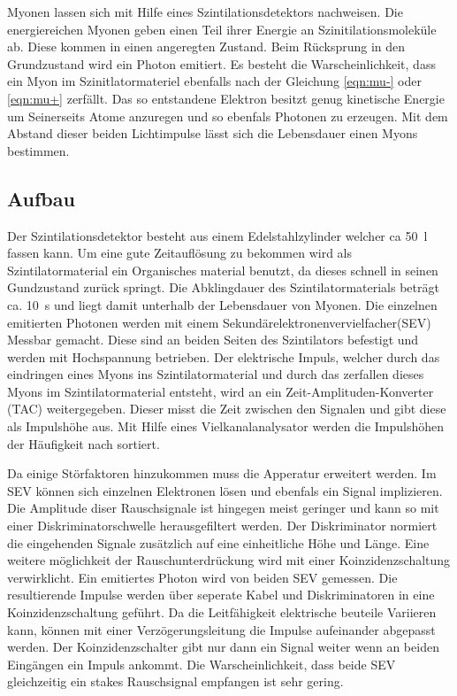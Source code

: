 Myonen lassen sich mit Hilfe eines Szintilationsdetektors nachweisen.
Die energiereichen Myonen geben einen Teil ihrer Energie an Szinitilationsmoleküle ab.
Diese kommen in einen angeregten Zustand.
Beim Rücksprung in den Grundzustand wird ein Photon emitiert.
Es besteht die Warscheinlichkeit, dass ein Myon im Szinitlatormateriel ebenfalls nach der Gleichung \ref{eqn:mu-}
oder \ref{eqn:mu+} zerfällt.
Das so entstandene Elektron besitzt genug kinetische Energie um Seinerseits Atome anzuregen und so ebenfals Photonen zu erzeugen.
Mit dem Abstand dieser beiden Lichtimpulse lässt sich die Lebensdauer einen Myons bestimmen.

\subsection{Aufbau}
Der Szintilationsdetektor besteht aus einem Edelstahlzylinder welcher ca \SI{50}{l} fassen kann.
Um eine gute Zeitauflösung zu bekommen wird als Szintilatormaterial ein Organisches material benutzt,
da dieses schnell in seinen Gundzustand zurück springt.
Die Abklingdauer des Szintilatormaterials beträgt ca. \SI{10}{s} und liegt damit unterhalb der Lebensdauer von Myonen.
Die einzelnen emitierten Photonen werden mit einem Sekundärelektronenvervielfacher(SEV) Messbar gemacht.
Diese sind an beiden Seiten des Szintilators befestigt und werden mit Hochspannung betrieben.
Der elektrische Impuls, welcher durch das eindringen eines Myons ins Szintilatormaterial
und durch das zerfallen dieses Myons im Szintilatormaterial entsteht,
wird an ein Zeit-Amplituden-Konverter (TAC) weitergegeben.
Dieser misst die Zeit zwischen den Signalen und gibt diese als Impulshöhe aus.
Mit Hilfe eines Vielkanalanalysator werden die Impulshöhen der Häufigkeit nach sortiert.

Da einige Störfaktoren hinzukommen muss die Apperatur erweitert werden.
Im SEV können sich einzelnen Elektronen lösen und ebenfals ein Signal implizieren.
Die Amplitude diser Rauschsignale ist hingegen meist geringer und kann so mit einer Diskriminatorschwelle herausgefiltert werden.
Der Diskriminator normiert die eingehenden Signale zusätzlich auf eine einheitliche Höhe und Länge.
Eine weitere möglichkeit der Rauschunterdrückung wird mit einer Koinzidenzschaltung verwirklicht.
Ein emitiertes Photon wird von beiden SEV gemessen.
Die resultierende Impulse werden über seperate Kabel und Diskriminatoren in eine Koinzidenzschaltung geführt.
Da die Leitfähigkeit elektrische beuteile Variieren kann,
können mit einer Verzögerungsleitung die Impulse aufeinander abgepasst werden.
Der Koinzidenzschalter gibt nur dann ein Signal weiter wenn an beiden Eingängen ein Impuls ankommt.
Die Warscheinlichkeit, dass beide SEV gleichzeitig ein stakes Rauschsignal empfangen ist sehr gering.

